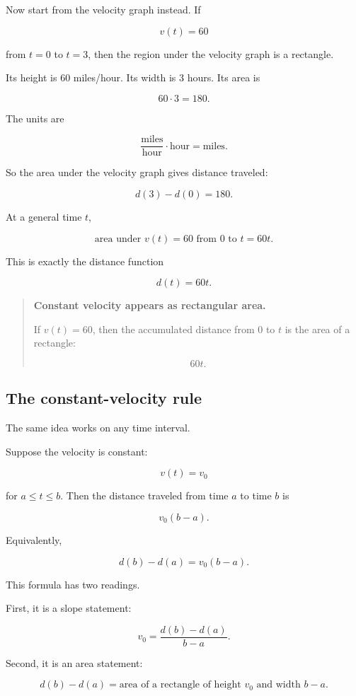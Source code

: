 Now start from the velocity graph instead. If

\[
v(t)=60
\]

from \(t=0\) to \(t=3\), then the region under the velocity graph is a rectangle.

Its height is \(60\) miles/hour. Its width is \(3\) hours. Its area is

\[
60\cdot 3=180.
\]

The units are

\[
\frac{\text{miles}}{\text{hour}}\cdot \text{hour}
=
\text{miles}.
\]

So the area under the velocity graph gives distance traveled:

\[
d(3)-d(0)=180.
\]

At a general time \(t\),

\[
\text{area under } v(t)=60 \text{ from }0\text{ to }t
=
60t.
\]

This is exactly the distance function

\[
d(t)=60t.
\]

\begin{quote}
\textbf{Constant velocity appears as rectangular area.}

If \(v(t)=60\), then the accumulated distance from \(0\) to \(t\) is the area of a rectangle:

\[
60t.
\]
\end{quote}

\subsection{The constant-velocity rule}

The same idea works on any time interval.

Suppose the velocity is constant:

\[
v(t)=v_0
\]

for \(a\leq t\leq b\). Then the distance traveled from time \(a\) to time \(b\) is

\[
v_0(b-a).
\]

Equivalently,

\[
\boxed{d(b)-d(a)=v_0(b-a).}
\]

This formula has two readings.

First, it is a slope statement:

\[
v_0=\frac{d(b)-d(a)}{b-a}.
\]

Second, it is an area statement:

\[
d(b)-d(a)=\text{area of a rectangle of height }v_0\text{ and width }b-a.
\]

